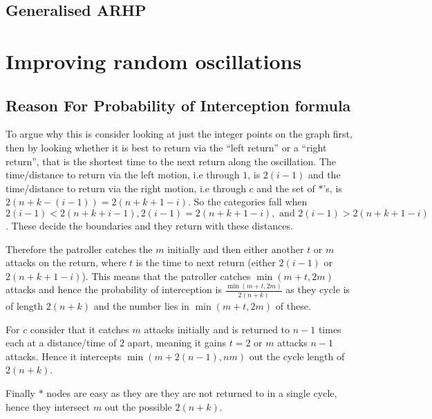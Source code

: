 \documentclass[a4paper,10pt]{article}
\theoremstyle{definition}
\theoremstyle{definition}
\theoremstyle{remark}
\theoremstyle{definition}
\begin{document}
\subsection{Generalised ARHP}
\label{Appendix:Generalised ARHP}


\section{Improving random oscillations}
\label{Appendix:Improving random oscillations}

\subsection{Reason For Probability of Interception formula}
\label{appednixsection: Reason for probability of interception}
To argue why this is consider looking at just the integer points on the graph first,
then by looking whether it is best to return via the ``left return'' or a ``right return'', that is the shortest time to the next return along the oscillation. The time/distance to return via the left motion, i.e through $1$, is $2(i-1)$ and the time/distance to return via the right motion, i.e through $c$ and the set of $*$'s, is $2(n+k-(i-1))=2(n+k+1-i)$. So the categories fall when $2(i-1) < 2(n+k+i-1) , 2(i-1)=2(n+k+1-i) , \text{ and } 2(i-1) > 2(n+k+1-i)$. These decide the boundaries and they return with these distances.

Therefore the patroller catches the $m$ initially and then either another $t$ or $m$ attacks on the return, where $t$ is the time to next return (either $2(i-1)$ or $2(n+k+1-i)$). This means that the patroller catches $\min(m+t,2m)$ attacks and hence the probability of interception is $\frac{\min(m+t,2m)}{2(n+k)}$ as they cycle is of length $2(n+k)$ and the number lies in $\min(m+t,2m)$ of these.

For $c$ consider that it catches $m$ attacks initially and is returned to $n-1$ times each at a distance/time of $2$ apart, meaning it gains $t=2$ or $m$ attacks $n-1$ attacks. Hence it intercepts $\min(m+2(n-1),nm)$ out the cycle length of $2(n+k)$.

Finally $*$ nodes are easy as they are they are not returned to in a single cycle, hence they intersect $m$ out the possible $2(n+k)$.
\end{document}
